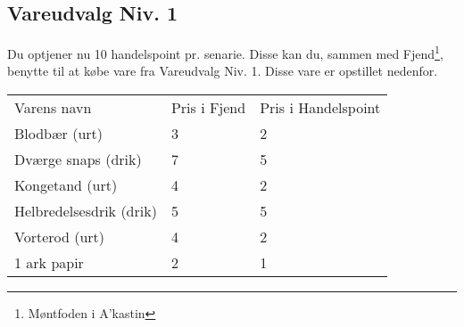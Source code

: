 \subsection*{Vareudvalg Niv. 1}
Du optjener nu 10 handelspoint pr. senarie. Disse kan du, sammen med Fjend\footnote{Møntfoden i A'kastin}, benytte til at købe vare fra Vareudvalg Niv. 1. Disse vare er opstillet nedenfor.
\begin{table}[H]
    \centering
    \begin{tabular}{|p{}|p{}|p{}|}
    \hline
    \rowcolor{cerulean!80}
    \multicolumn{3}{c}{Vareudvalg Niv. 1}\\
    \hline
    \rowcolor{cerulean!40}
         Varens navn & Pris i Fjend & Pris i Handelspoint \\\hline
         Blodbær (urt) & 3 & 2\\\hline
         Dværge snaps (drik) & 7 & 5\\\hline
         Kongetand (urt) & 4 & 2\\\hline
         Helbredelsesdrik (drik) & 5 & 5\\\hline
         Vorterod (urt) & 4 & 2\\\hline
         1 ark papir & 2 & 1\\\hline
    \end{tabular}
    \end{table}